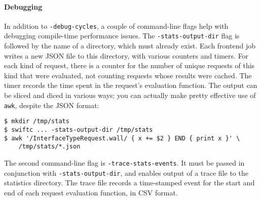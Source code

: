 \documentclass[a4paper,headsepline,bibliography=totoc,toc=flat,fleqn,twoside=semi]{scrbook}
\theoremstyle{definition}
\theoremstyle{definition}
\theoremstyle{definition}
\begin{document}
\paragraph{Debugging} In addition to \texttt{-debug-cycles}, a couple of command-line flags help with debugging compile-time performance issues. The \texttt{-stats-output-dir} flag is followed by the name of a directory, which must already exist. Each frontend job writes a new JSON file to this directory, with various counters and timers. For each kind of request, there is a counter for the number of unique requests of this kind that were evaluated, not counting requests whose results were cached. The timer records the time spent in the request's evaluation function. The output can be sliced and diced in various ways; you can actually make pretty effective use of \texttt{awk}, despite the JSON format:
\begin{Verbatim}
$ mkdir /tmp/stats
$ swiftc ... -stats-output-dir /tmp/stats
$ awk '/InterfaceTypeRequest.wall/ { x += $2 } END { print x }' \
    /tmp/stats/*.json
\end{Verbatim}
The second command-line flag is \texttt{-trace-stats-events}. It must be passed in conjunction with \texttt{-stats-output-dir}, and enables output of a trace file to the statistics directory. The trace file records a time-stamped event for the start and end of each request evaluation function, in CSV format.
\end{document}
